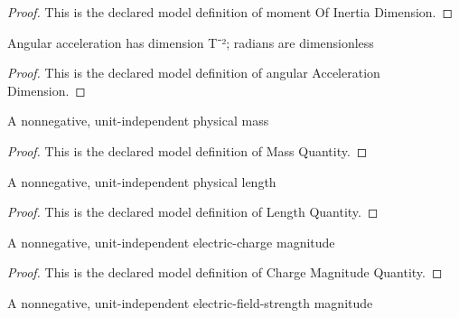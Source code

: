 \begin{proof}
  This is the declared model definition of moment Of Inertia Dimension.
\end{proof}
\begin{definition}
  \label{def:physics:phyx-mini-0910:phyxminiproblems-problemphyxmini0910-angularaccelerationdimension}
  Angular acceleration has dimension T⁻²; radians are dimensionless
\end{definition}
\begin{proof}
  This is the declared model definition of angular Acceleration Dimension.
\end{proof}
\begin{definition}
  \label{def:physics:phyx-mini-0910:phyxminiproblems-problemphyxmini0910-massquantity}
  A nonnegative, unit-independent physical mass
\end{definition}
\begin{proof}
  This is the declared model definition of Mass Quantity.
\end{proof}
\begin{definition}
  \label{def:physics:phyx-mini-0910:phyxminiproblems-problemphyxmini0910-lengthquantity}
  A nonnegative, unit-independent physical length
\end{definition}
\begin{proof}
  This is the declared model definition of Length Quantity.
\end{proof}
\begin{definition}
  \label{def:physics:phyx-mini-0910:phyxminiproblems-problemphyxmini0910-chargemagnitudequantity}
  A nonnegative, unit-independent electric-charge magnitude
\end{definition}
\begin{proof}
  This is the declared model definition of Charge Magnitude Quantity.
\end{proof}
\begin{definition}
  \label{def:physics:phyx-mini-0910:phyxminiproblems-problemphyxmini0910-electricfieldstrengthmagnitude}
  A nonnegative, unit-independent electric-field-strength magnitude
\end{definition}
